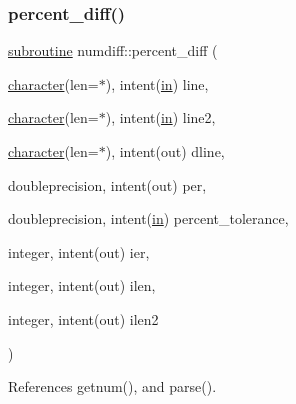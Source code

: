 \subsubsection{\texorpdfstring{percent\+\_\+diff()}{percent\_diff()}}
{\footnotesize\ttfamily \hyperlink{M__stopwatch_83_8txt_acfbcff50169d691ff02d4a123ed70482}{subroutine} numdiff\+::percent\+\_\+diff (\begin{DoxyParamCaption}\item[{\hyperlink{option__stopwatch_83_8txt_abd4b21fbbd175834027b5224bfe97e66}{character}(len=$\ast$), intent(\hyperlink{M__journal_83_8txt_afce72651d1eed785a2132bee863b2f38}{in})}]{line,  }\item[{\hyperlink{option__stopwatch_83_8txt_abd4b21fbbd175834027b5224bfe97e66}{character}(len=$\ast$), intent(\hyperlink{M__journal_83_8txt_afce72651d1eed785a2132bee863b2f38}{in})}]{line2,  }\item[{\hyperlink{option__stopwatch_83_8txt_abd4b21fbbd175834027b5224bfe97e66}{character}(len=$\ast$), intent(out)}]{dline,  }\item[{doubleprecision, intent(out)}]{per,  }\item[{doubleprecision, intent(\hyperlink{M__journal_83_8txt_afce72651d1eed785a2132bee863b2f38}{in})}]{percent\+\_\+tolerance,  }\item[{integer, intent(out)}]{ier,  }\item[{integer, intent(out)}]{ilen,  }\item[{integer, intent(out)}]{ilen2 }\end{DoxyParamCaption})}



References getnum(), and parse().


